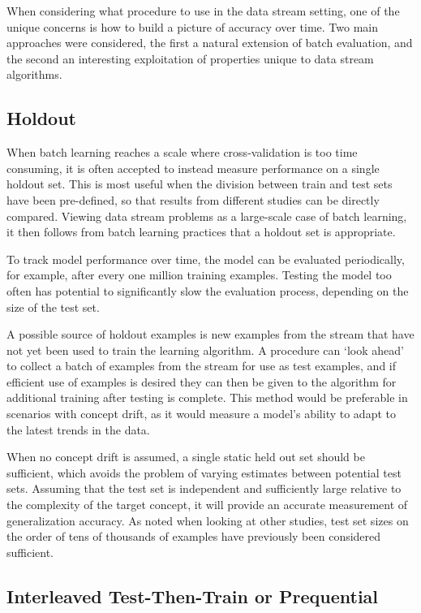 When considering what procedure to use in the data stream setting, one of the unique concerns is how to build a picture of accuracy over time.
Two main approaches were considered, the first a natural extension of batch evaluation, and the second an interesting exploitation of properties unique to data stream algorithms.

\subsection{Holdout}

When batch learning reaches a scale where cross-validation is too time consuming, it is often accepted to instead measure performance on a single holdout set. This is most useful when the division between train and test sets have been pre-defined, so that results from different studies can be directly compared. Viewing data stream problems as a large-scale case of batch learning, it then follows from batch learning practices that a holdout set is appropriate. 

To track model performance over time, the model can be evaluated periodically, for example, after every one million training examples. Testing the model too often has potential to significantly slow the evaluation process, depending on the size of the test set.

A possible source of holdout examples is new examples from the stream that have not yet been used to train the learning algorithm. A procedure can `look ahead' to collect a batch of examples from the stream for use as test examples, and if efficient use of examples is desired they can then be given to the algorithm for additional training after testing is complete. This method would be preferable in scenarios with concept drift, as it would measure a model's ability to adapt to the latest trends in the data.

When no concept drift is assumed, a single static held out set should be sufficient, which avoids the problem of varying estimates between potential test sets. Assuming that the test set is independent and sufficiently large relative to the complexity of the target concept, it will provide an accurate measurement of generalization accuracy. As noted when looking at other studies, test set sizes on the order of tens of thousands of examples have previously been considered sufficient.

\subsection{Interleaved Test-Then-Train or Prequential}

